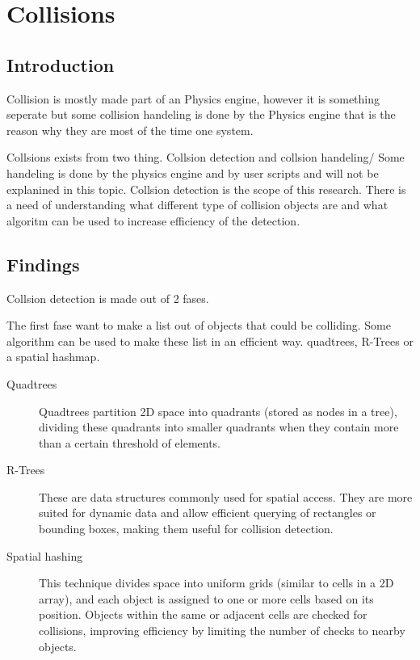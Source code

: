 \documentclass{projdoc}
\begin{document}
\section{Collisions}

\subsection{Introduction}

Collision is mostly made part of an Physics engine, however it is something seperate
but some collision handeling is done by the Physics engine that is the reason why
they are most of the time one system.

Collsions exists from two thing. Collsion detection and collsion handeling/ Some
handeling is done by the physics engine and by user scripts and will not be
explanined in this topic. Collsion detection is the scope of this research. There is
a need of understanding what different type of collision objects are and what
algoritm can be used to increase efficiency of the detection.

\subsection{Findings}

Collsion detection is made out of 2 fases.





The first fase want to make a list out of objects that could be colliding. Some
algorithm can be used to make these list in an efficient way. quadtrees, R-Trees or
a spatial hashmap.

\begin{description}
	\item[Quadtrees] Quadtrees partition 2D space into quadrants (stored as nodes in a
		tree), dividing these quadrants into smaller quadrants when they contain more
		than a certain threshold of elements.
	\item[R-Trees] These are data structures commonly used for spatial access. They are
		more suited for dynamic data and allow efficient querying of rectangles or
		bounding boxes, making them useful for collision detection.
	\item[Spatial hashing] This technique divides space into uniform grids (similar to
		cells in a 2D array), and each object is assigned to one or more cells based on
		its position. Objects within the same or adjacent cells are checked for
		collisions, improving efficiency by limiting the number of checks to nearby
		objects.
\end{description}
\end{document}
